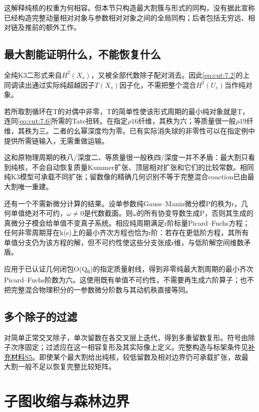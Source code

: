 \documentclass[11pt,a4paper,oneside]{ctexart}
\theoremstyle{cnplain}
\theoremstyle{definition}
\theoremstyle{remark}
\numberwithin{equation}{section}
\newcommand{\otherref}[2]{\href{#1.pdf}{#2}}
\begin{document}
这解释纯核的权重为何相容。但本节只构造最大割簇与形式的同构，没有据此宣称已经构造完整动量相对对象与参数相对对象之间的全局同构；后者包括无穷远、相对链及推前的额外工作。


\subsection{最大割能证明什么，不能恢复什么}\label{sec:cut:8}

全纯K3二形式来自\(H^{2}(X_s)\)，又被全部代数除子配对消去。因此\eqref{eq:cut:7.2}的上同调读出通过实际纯超越因子\(T(X_s)\)因子化，不需把整个混合\(H^{2}(U_s)\)当作纯对象。

若所取割循环在T的对偶中非零，T的简单性使该形式周期的最小纯对象就是T，连同\eqref{eq:cut:7.6}所需的Tate扭转。在指定\(\rho 16\)纤维，其秩为六；等质量很一般\(\rho 19\)纤维，其秩为三。二者的幺幂深度均为零。已有实际消失球的非零性可以在指定例中提供所需链输入，无需重做运输。

这和原物理周期的秩八/深度二、等质量很一般秩四/深度一并不矛盾：最大割只看到纯核，不会自动恢复质量Kummer扩张、顶层相对扩张和它们的比较常数。相同纯K3模型可承载不同扩张；留数像的精确几何识别不等于完整混合coaction已由最大割唯一重建。

还有一个不需新微分计算的结果。设单参数纯Gauss--Manin微分模P的秩为r，几何单值绝对不可约，\(\omega \ne 0\)是代数截面。则\(\omega \)的所有协变导数生成P，否则其生成的真微分子模会给单值不变真子系统。相应纯周期满足r阶标量Picard--Fuchs方程；任何非零周期芽在k(s)上的最小齐次方程也恰为r阶：若存在更低阶方程，其所有单值分支仍为该方程的解，但不可约性使这些分支张成r维，与低阶解空间维数矛盾。

应用于已认证几何闭包O(Q\textsubscript{6})的指定质量射线，得到非零纯最大割周期的最小齐次Picard--Fuchs阶数为六。这使用既有单值不可约性，不需要再生成六阶算子；也不把完整混合物理积分的一参数微分阶数与其动机秩直接等同。



\endgroup
\subsection{多个除子的过滤}
对简单正常交叉除子，单次留数在各交叉层上迭代，得到多重留数复形。符号由除子次序固定；过滤应在这一相容复形及其实际像上定义。完整构造与标架条件见\otherref{feynman_periods_supplement}{补充材料S5}。即使某个最大割给出纯核，较低留数及相对边界仍可承载扩张，故最大割一般不足以恢复完整比较矩阵。

\section{子图收缩与森林边界}\label{ch:contraction}
\end{document}
